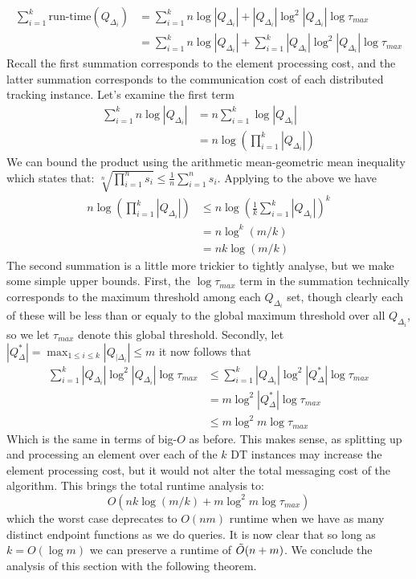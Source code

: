 \begin{align*}
\sum_{i=1}^{k}\text{run-time}(Q_{\Delta_i}) &= \sum_{i=1}^{k} n\log |Q_{\Delta_i}| + |Q_{\Delta_i}|\log^2 |Q_{\Delta_i}| \log\tau_{max} \\
&= \sum_{i=1}^{k} n\log |Q_{\Delta_i}| + \sum_{i=1}^{k}  |Q_{\Delta_i}|\log^2 |Q_{\Delta_i}| \log\tau_{max} 
\end{align*}
Recall the first summation corresponds to the element processing cost, and the latter summation corresponds to the communication cost of each distributed tracking instance. Let's examine the first term
\begin{align*}
    \sum_{i=1}^{k} n\log |Q_{\Delta_i}| &= n\sum_{i=1}^{k}\log |Q_{\Delta_i}| \\
    &= n \log \left(\prod_{i=1}^{k}|Q_{\Delta_i}| \right)
\end{align*}
We can bound the product using the arithmetic mean-geometric mean inequality which states that: 
$\sqrt[n]{\prod_{i=1}^{n} s_i} \leq \frac{1}{n}\sum_{i=1}^{n}s_i$. Applying to the above we have
\begin{align*}
     n \log \left(\prod_{i=1}^{k}|Q_{\Delta_i}| \right) &\leq n \log\left(
     \frac{1}{k}\sum_{i=1}^{k}|Q_{\Delta_i}|\right)^k \\
     &= n\log^k (m/k) \\ 
     &= nk\log (m/k)
\end{align*}
The second summation is a little more trickier to tightly analyse, but we make some simple upper bounds. First, the $\log\tau_{max}$ term in the summation technically corresponds to the maximum threshold among each $Q_{\Delta_{i}}$ set, though clearly each of these will be less than or equaly to the global maximum threshold over all $Q_{\Delta_i}$, so we let $\tau_{max}$ denote this global threshold. Secondly, let $|Q_{\Delta}^*| = \max_{1\leq i \leq k} |Q_{|\Delta_i}|\leq m$ it now follows that 
\begin{align*}
    \sum_{i=1}^{k}  |Q_{\Delta_i}|\log^2 |Q_{\Delta_i}| \log\tau_{max} &\leq \sum_{i=1}^{k}  |Q_{\Delta_i}|\log^2 |Q_{\Delta}^*| \log\tau_{max} \\
    &= m\log^2 |Q_{\Delta}^*| \log\tau_{max} \\
    &\leq m\log^2 m \log\tau_{max}
\end{align*}
Which is the same in terms of big-$O$ as before. This makes sense, as splitting up and processing an element over each of the $k$ DT instances may increase the element processing cost, but it would not alter the total messaging cost of the algorithm. This brings the total runtime analysis to: 
$$O(nk\log (m/k) + m\log^2 m \log\tau_{max})$$
which the worst case deprecates to $O(nm)$ runtime when we have as many distinct endpoint functions as we do queries. It is now clear that so long as $k = O(\log m)$ we can preserve a runtime of $\Tilde{O}(n+m)$. We conclude the analysis of this section with the following theorem. 


